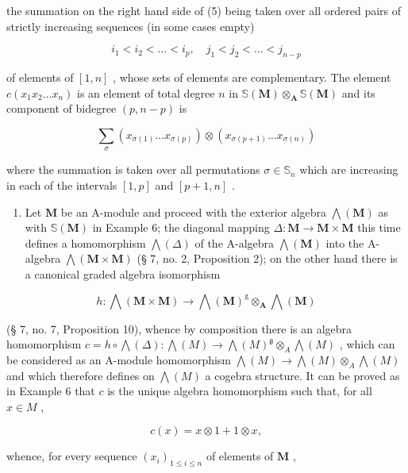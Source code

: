 the summation on the right hand side of (5) being taken over all ordered pairs of strictly increasing sequences (in some cases empty)

\[
i _ {1} <   i _ {2} <   \dots <   i _ {p}, \quad j _ {1} <   j _ {2} <   \dots <   j _ {n - p}
\]

of elements of \([1, n]\) , whose sets of elements are complementary. The element \(c(x_1 x_2 \ldots x_n)\) is an element of total degree \(n\) in \(\mathbb{S}(\mathbf{M}) \otimes_{\mathbf{A}} \mathbb{S}(\mathbf{M})\) and its component of bidegree \((p, n - p)\) is

\[
\sum_ {\sigma} \left(x _ {\sigma (1)} \dots x _ {\sigma (p)}\right) \otimes \left(x _ {\sigma (p + 1)} \dots x _ {\sigma (n)}\right)\tag{6}
\]

where the summation is taken over all permutations \(\sigma\in\mathbb{S}_{n}\) which are increasing in each of the intervals \([1,p]\) and \([p+1,n]\) .

\begin{enumerate}
\def\labelenumi{(\arabic{enumi})}
\setcounter{enumi}{6}
\tightlist
\item
  Let \(\mathbf{M}\) be an A-module and proceed with the exterior algebra \(\bigwedge (\mathbf{M})\) as with \(\mathbb{S}(\mathbf{M})\) in Example 6; the diagonal mapping \(\Delta : \mathbf{M} \to \mathbf{M} \times \mathbf{M}\) this time defines a homomorphism \(\bigwedge (\Delta)\) of the A-algebra \(\bigwedge (\mathbf{M})\) into the A-algebra \(\bigwedge (\mathbf{M} \times \mathbf{M})\) (§ 7, no. 2, Proposition 2); on the other hand there is a canonical graded algebra isomorphism
\end{enumerate}

\[
h: \bigwedge (\mathbf {M} \times \mathbf {M}) \rightarrow \bigwedge (\mathbf {M}) ^ {\mathrm{g}} \otimes_ {\mathbf {A}} \bigwedge (\mathbf {M})
\]

(§ 7, no. 7, Proposition 10), whence by composition there is an algebra homomorphism \(c = h \circ \bigwedge(\Delta): \bigwedge(M) \to \bigwedge(M)^{\mathfrak{g}} \otimes_{A} \bigwedge(M)\) , which can be considered as an A-module homomorphism \(\bigwedge(M) \to \bigwedge(M) \otimes_{A} \bigwedge(M)\) and which therefore defines on \(\bigwedge(M)\) a cogebra structure. It can be proved as in Example 6 that \(c\) is the unique algebra homomorphism such that, for all \(x \in M\) ,

\[
c (x) = x \otimes 1 + 1 \otimes x,\tag{7}
\]

whence, for every sequence \((x_{i})_{1\leqslant i\leqslant n}\) of elements of \(\mathbf{M}\) ,

